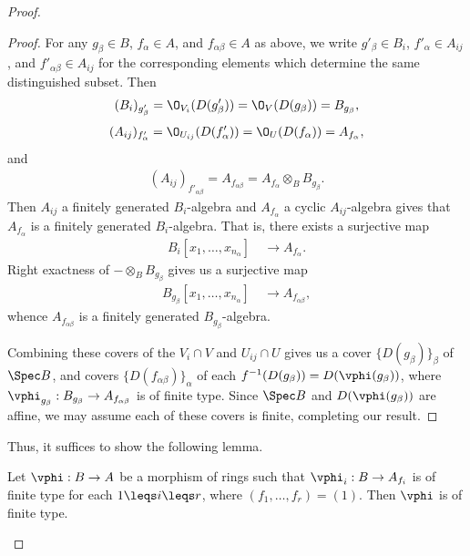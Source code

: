 \documentclass[12pt]{amsart}
\begin{document}
\begin{proof}
\begin{proof}
    For any $g_\beta\in B$, $f_\alpha\in A$, and $f_{\alpha\beta}\in A$ as above, we write $g'_\beta\in B_i$, $f'_\alpha\in A_{ij}$, and $f'_{\alpha\beta}\in A_{ij}$ for the corresponding elements which determine the same distinguished subset.
    Then
    \begin{align*}
      (B_i)_{g'_\beta} 
      = \O_{V_i}(D(g'_\beta)) 
      = \O_V(D(g_\beta))
      = B_{g_\beta},
    \end{align*}
    \begin{align*}
      (A_{ij})_{f'_\alpha} 
      = \O_{U_{ij}}(D(f'_\alpha))  
      = \O_U(D(f_\alpha)) 
      = A_{f_\alpha},
    \end{align*}
    and
    \begin{align*}
      (A_{ij})_{f'_{\alpha\beta}}
      = A_{f_{\alpha\beta}}
      = A_{f_\alpha}\otimes_B B_{g_{\beta}}.
    \end{align*}
    Then $A_{ij}$ a finitely generated $B_i$-algebra and $A_{f_\alpha}$ a cyclic $A_{ij}$-algebra gives that $A_{f_\alpha}$ is a finitely generated $B_i$-algebra.
    That is, there exists a surjective map
    \begin{align*}
      B_i[x_1,\ldots, x_{n_\alpha}]~&\rightarrow A_{f_\alpha}.
    \end{align*}
    Right exactness of $-\otimes_B B_{g_\beta}$ gives us a surjective map
    \begin{align*}
      B_{g_\beta}[x_1,\ldots, x_{n_\alpha}]~&\rightarrow A_{f_{\alpha\beta}},
    \end{align*}
    whence $A_{f_{\alpha\beta}}$ is a finitely generated $B_{g_\beta}$-algebra.

    Combining these covers of the $V_i\cap V$ and $U_{ij}\cap U$ gives us a cover $\{D(g_\beta)\}_\beta$ of $\Spec B$, and covers $\{D(f_{\alpha\beta}) \}_\alpha$ of each $f^{-1}(D(g_\beta))=D(\vphi(g_\beta))$, where $\vphi_{g_\beta}:B_{g_\beta}\to A_{f_{\alpha\beta}}$ is of finite type.
    Since $\Spec B$ and $D(\vphi(g_\beta))$ are affine, we may assume each of these covers is finite, completing our result.
  \end{proof}

  Thus, it suffices to show the following lemma.

  \begin{lemma}
    Let $\vphi:B\to A$ be a morphism of rings such that $\vphi_i:B\to A_{f_i}$ is of finite type for each $1\leqs i\leqs r$, where $(f_1,\ldots, f_r)=(1)$.
    Then $\vphi$ is of finite type.
  \end{lemma}


\end{proof}
\end{document}
